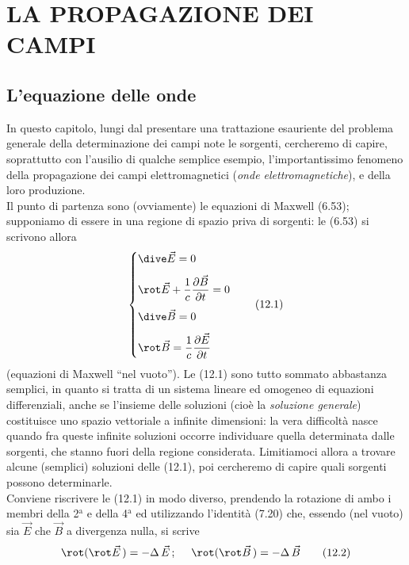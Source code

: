 \section{LA PROPAGAZIONE DEI CAMPI}

\subsection{L'equazione delle onde}

In questo capitolo, lungi dal presentare una trattazione esauriente del problema
generale della determinazione dei campi note le sorgenti, cercheremo di capire,
soprattutto con l'ausilio di qualche semplice esempio, l'importantissimo
fenomeno della propagazione dei campi elettromagnetici (\textit{onde
elettromagnetiche}), e della loro produzione.\\
Il punto di partenza sono (ovviamente) le equazioni di Maxwell (6.53);
supponiamo di essere in una regione di spazio priva di sorgenti: le (6.53) si
scrivono allora
\begin{equation}
  \left\{\begin{aligned}
    &\dive\vec E=0\\[4pt]
    &\rot\vec E+\frac{1}{c}\frac{\partial\vec B}{\partial t}=0\\[4pt]
    &\dive\vec B=0\\[4pt]
    &\rot\vec B=\frac{1}{c}\frac{\partial\vec E}{\partial t}
  \end{aligned}\right.
  \tag{12.1}
\end{equation}
(equazioni di Maxwell ``nel vuoto''). Le (12.1) sono tutto sommato abbastanza
semplici, in quanto si tratta di un sistema lineare ed omogeneo di equazioni
differenziali, anche se l'insieme delle soluzioni (cio\`e la \textit{soluzione
generale}) costituisce uno spazio vettoriale a infinite dimensioni: la vera
difficolt\`a nasce quando fra queste infinite soluzioni occorre individuare
quella determinata dalle sorgenti, che stanno fuori della regione considerata.
Limitiamoci allora a trovare alcune (semplici) soluzioni delle (12.1), poi
cercheremo di capire quali sorgenti possono determinarle.\\
Conviene riscrivere le (12.1) in modo diverso, prendendo la rotazione di ambo i
membri della 2$^\mathrm{a}$ e della 4$^\mathrm{a}$ ed utilizzando l'identit\`a
(7.20) che, essendo (nel vuoto) sia $\vec E$ che $\vec B$ a divergenza nulla, si
scrive
\begin{equation}
  \rot(\rot\vec E\,)=-\Delta\,\vec E\,;\quad\ \rot(\rot\vec B\,)=-\Delta\,\vec B
  \tag{12.2}
\end{equation}
